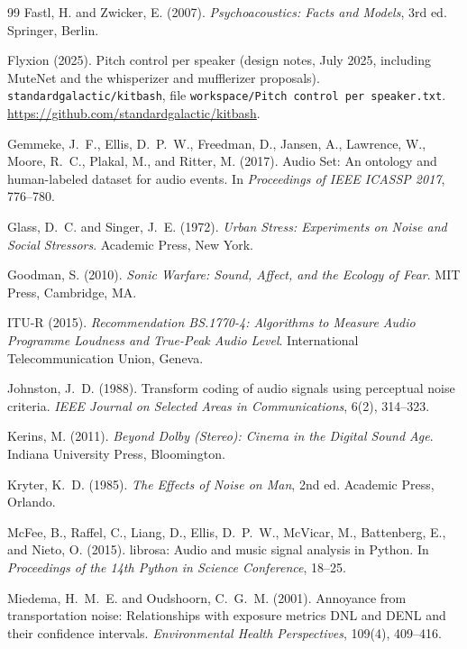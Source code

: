 \begin{thebibliography}{99}
Fastl, H. and Zwicker, E. (2007). \emph{Psychoacoustics: Facts and Models}, 3rd ed. Springer, Berlin.

Flyxion (2025). Pitch control per speaker (design notes, July 2025, including MuteNet and the whisperizer and mufflerizer proposals). \texttt{standardgalactic/kitbash}, file \texttt{workspace/Pitch control per speaker.txt}. \url{https://github.com/standardgalactic/kitbash}.

Gemmeke, J.~F., Ellis, D.~P.~W., Freedman, D., Jansen, A., Lawrence, W., Moore, R.~C., Plakal, M., and Ritter, M. (2017). Audio Set: An ontology and human-labeled dataset for audio events. In \emph{Proceedings of IEEE ICASSP 2017}, 776--780.

Glass, D.~C. and Singer, J.~E. (1972). \emph{Urban Stress: Experiments on Noise and Social Stressors}. Academic Press, New York.

Goodman, S. (2010). \emph{Sonic Warfare: Sound, Affect, and the Ecology of Fear}. MIT Press, Cambridge, MA.

ITU-R (2015). \emph{Recommendation BS.1770-4: Algorithms to Measure Audio Programme Loudness and True-Peak Audio Level}. International Telecommunication Union, Geneva.

Johnston, J.~D. (1988). Transform coding of audio signals using perceptual noise criteria. \emph{IEEE Journal on Selected Areas in Communications}, 6(2), 314--323.

Kerins, M. (2011). \emph{Beyond Dolby (Stereo): Cinema in the Digital Sound Age}. Indiana University Press, Bloomington.

Kryter, K.~D. (1985). \emph{The Effects of Noise on Man}, 2nd ed. Academic Press, Orlando.

McFee, B., Raffel, C., Liang, D., Ellis, D.~P.~W., McVicar, M., Battenberg, E., and Nieto, O. (2015). librosa: Audio and music signal analysis in Python. In \emph{Proceedings of the 14th Python in Science Conference}, 18--25.

Miedema, H.~M.~E. and Oudshoorn, C.~G.~M. (2001). Annoyance from transportation noise: Relationships with exposure metrics DNL and DENL and their confidence intervals. \emph{Environmental Health Perspectives}, 109(4), 409--416.


\end{thebibliography}
